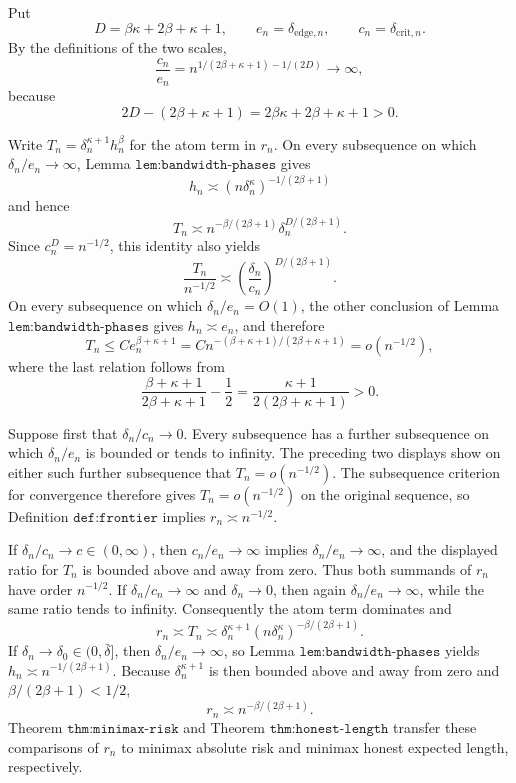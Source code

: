 Put
\[
 D=\beta\kappa+2\beta+\kappa+1,
 \qquad e_n=\delta_{\mathrm{edge},n},
 \qquad c_n=\delta_{\mathrm{crit},n}.
\]
By the definitions of the two scales,
\[
 \frac{c_n}{e_n}
 =n^{1/(2\beta+\kappa+1)-1/(2D)}\longrightarrow\infty,
\]
because
\[
 2D-(2\beta+\kappa+1)=2\beta\kappa+2\beta+\kappa+1>0.
\]

Write \(T_n=\delta_n^{\kappa+1}h_n^\beta\) for the atom term in \(r_n\).  On every subsequence on which \(\delta_n/e_n\to\infty\), Lemma \(\texttt{lem:bandwidth-phases}\) gives
\[
 h_n\asymp(n\delta_n^\kappa)^{-1/(2\beta+1)}
\]
and hence
\[
 T_n\asymp
 n^{-\beta/(2\beta+1)}
 \delta_n^{D/(2\beta+1)}.
\]
Since \(c_n^D=n^{-1/2}\), this identity also yields
\[
 \frac{T_n}{n^{-1/2}}
 \asymp
 \left(\frac{\delta_n}{c_n}\right)^{D/(2\beta+1)}.
\]
On every subsequence on which \(\delta_n/e_n=O(1)\), the other conclusion of Lemma \(\texttt{lem:bandwidth-phases}\) gives \(h_n\asymp e_n\), and therefore
\[
 T_n\leq C e_n^{\beta+\kappa+1}
 =C n^{-(\beta+\kappa+1)/(2\beta+\kappa+1)}
 =o(n^{-1/2}),
\]
where the last relation follows from
\[
 \frac{\beta+\kappa+1}{2\beta+\kappa+1}-\frac12
 =\frac{\kappa+1}{2(2\beta+\kappa+1)}>0.
\]

Suppose first that \(\delta_n/c_n\to0\).  Every subsequence has a further subsequence on which \(\delta_n/e_n\) is bounded or tends to infinity.  The preceding two displays show on either such further subsequence that \(T_n=o(n^{-1/2})\).  The subsequence criterion for convergence therefore gives \(T_n=o(n^{-1/2})\) on the original sequence, so Definition \(\texttt{def:frontier}\) implies \(r_n\asymp n^{-1/2}\).

If \(\delta_n/c_n\to c\in(0,\infty)\), then \(c_n/e_n\to\infty\) implies \(\delta_n/e_n\to\infty\), and the displayed ratio for \(T_n\) is bounded above and away from zero.  Thus both summands of \(r_n\) have order \(n^{-1/2}\).  If \(\delta_n/c_n\to\infty\) and \(\delta_n\to0\), then again \(\delta_n/e_n\to\infty\), while the same ratio tends to infinity.  Consequently the atom term dominates and
\[
 r_n\asymp T_n
 \asymp\delta_n^{\kappa+1}(n\delta_n^\kappa)^{-\beta/(2\beta+1)}.
\]
If \(\delta_n\to\delta_0\in(0,\bar\delta]\), then \(\delta_n/e_n\to\infty\), so Lemma \(\texttt{lem:bandwidth-phases}\) yields \(h_n\asymp n^{-1/(2\beta+1)}\).  Because \(\delta_n^{\kappa+1}\) is then bounded above and away from zero and \(\beta/(2\beta+1)<1/2\),
\[
 r_n\asymp n^{-\beta/(2\beta+1)}.
\]
Theorem \(\texttt{thm:minimax-risk}\) and Theorem \(\texttt{thm:honest-length}\) transfer these comparisons of \(r_n\) to minimax absolute risk and minimax honest expected length, respectively.

